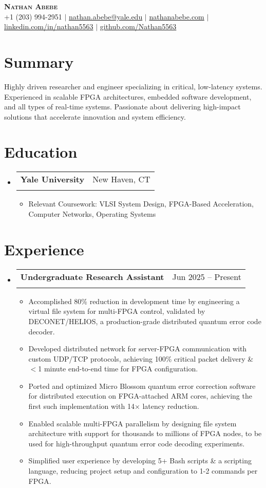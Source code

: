 \documentclass[letterpaper,11pt]{article}
\makeatletter
\newcommand{\resumeItem}[1]{
  \item\small{
    {#1 \vspace{-2pt}}
  }
}
\newcommand{\resumeSummary}[1]{
    #1
}
\newcommand{\resumeSubheading}[4]{
  \vspace{-2pt}\item
    \begin{tabular*}{0.97\textwidth}[t]{l@{\extracolsep{\fill}}r}
      \textbf{#1} & #2 \\
      \text{\small#3} & \text{\small #4} \\
    \end{tabular*}\vspace{-7pt}
}
\newcommand{\resumeSubHeadingListStart}{\begin{itemize}[leftmargin=0.15in, label={}]}
\newcommand{\resumeSubHeadingListEnd}{\end{itemize}}
\newcommand{\resumeItemListStart}{\begin{itemize}}
\newcommand{\resumeItemListEnd}{\end{itemize}\vspace{-5pt}}
\makeatother
\begin{document}
\begin{center}
    \textbf{\Huge \scshape Nathan Abebe} \\ \vspace{5pt}
    \small +1 (203) 994-2951 $|$ \href{mailto:nathan.abebe@yale.edu}{nathan.abebe@yale.edu} $|$ \href{https://nathanabebe.com}{nathanabebe.com} $|$ 
    \href{https://linkedin.com/in/nathan5563}{linkedin.com/in/nathan5563} $|$
    \href{https://github.com/Nathan5563}{github.com/Nathan5563}
\end{center}

\section{Summary}
    \resumeSummary{Highly driven researcher and engineer specializing in critical, low-latency systems. Experienced in scalable FPGA architectures, embedded software development, and all types of real-time systems. Passionate about delivering high-impact solutions that accelerate innovation and system efficiency.}

\section{Education}
  \resumeSubHeadingListStart
    \resumeSubheading
      {Yale University}{New Haven, CT}
      {B.S. Computer Science, B.S. Electrical Engineering (ABET)}{May 2028}
      \resumeItemListStart
        \resumeItem{Relevant Coursework: VLSI System Design, FPGA-Based Acceleration, Computer Networks, Operating Systems }
      \resumeItemListEnd
  \resumeSubHeadingListEnd


\section{Experience}
  \resumeSubHeadingListStart
    \resumeSubheading
      {Undergraduate Research Assistant}{Jun 2025 -- Present}
      {Yale University, Advisor: Professor Lin Zhong, Ph.D.}{New Haven, CT}
      \resumeItemListStart
        \resumeItem{Accomplished 80\% reduction in development time by engineering a virtual file system for multi-FPGA control, validated by DECONET/HELIOS, a production-grade distributed quantum error code decoder.}
        \resumeItem{Developed distributed network for server-FPGA communication with custom UDP/TCP protocols, achieving 100\% critical packet delivery \& $<$1 minute end-to-end time for FPGA configuration.}
        \resumeItem{Ported and optimized Micro Blossom quantum error correction software for distributed execution on FPGA-attached ARM cores, achieving the first such implementation with 14× latency reduction.}
        \resumeItem{Enabled scalable multi-FPGA parallelism by designing file system architecture with support for thousands to millions of FPGA nodes, to be used for high-throughput quantum error code decoding experiments.}
        \resumeItem{Simplified user experience by developing 5+ Bash scripts \& a scripting language, reducing project setup and configuration to 1-2 commands per FPGA.}
      \resumeItemListEnd
  \resumeSubHeadingListEnd
\end{document}
